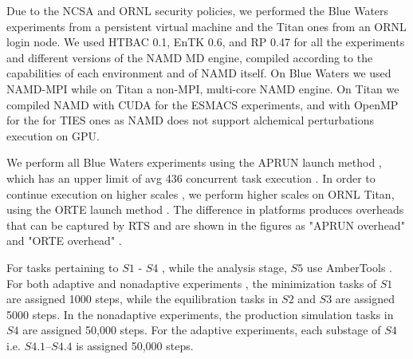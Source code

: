 Due to the NCSA and ORNL security policies, we performed the Blue Waters
experiments from a persistent virtual machine and the Titan ones from an ORNL
login node.
We used HTBAC 0.1, EnTK 0.6, and RP 0.47 for all the experiments and
different versions of the NAMD MD engine, compiled according to the
capabilities of each environment and of NAMD itself. On Blue Waters we used
NAMD-MPI while on Titan a non-MPI, multi-core NAMD engine. On Titan we
compiled NAMD with CUDA for the ESMACS experiments, and with OpenMP for the
for TIES ones as NAMD does not support alchemical perturbations execution on
GPU.

We perform  all Blue Waters
experiments using the APRUN launch method , which has an upper limit of avg 436 concurrent task
execution . In order to continue
execution on higher scales , we
perform higher scales  on ORNL Titan, using the ORTE launch method .
The difference in platforms produces overheads  that can be captured by RTS  and are shown  in the figures  as
"APRUN overhead" and "ORTE overhead" .

For tasks pertaining to $S1$ - $S4$ , while the analysis
stage, $S5$ use AmberTools . For both adaptive and nonadaptive experiments , the
minimization tasks of $S1$ are assigned 1000 steps, while the equilibration
tasks in $S2$ and $S3$ are assigned 5000 steps. In the nonadaptive
experiments, the production simulation tasks  in $S4$ are
assigned 50,000 steps. For the adaptive experiments, each substage
 of $S4$ i.e. $S4.1$--$S4.4$ is assigned 50,000
steps.

